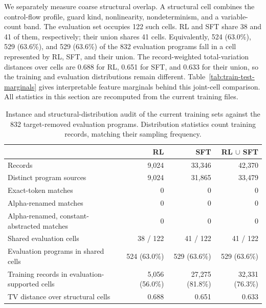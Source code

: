 We separately measure coarse structural overlap.  A structural cell combines
the control-flow profile, guard kind, nonlinearity, nondeterminism, and a
variable-count band.  The evaluation set occupies 122 such cells.  RL and SFT
share 38 and 41 of them, respectively; their union shares 41 cells.
Equivalently, 524 (63.0\%), 529 (63.6\%), and 529 (63.6\%) of the 832
evaluation programs fall in a cell represented by RL, SFT, and their union.
The record-weighted total-variation distances over cells are 0.688 for RL,
0.651 for SFT, and 0.633 for their union, so the training and evaluation
distributions remain different.  Table~\ref{tab:train-test-marginals} gives
interpretable feature marginals behind this joint-cell comparison.
All statistics in this section are recomputed from the current training files.

\begin{table}[H]
\centering
\setlength{\tabcolsep}{5pt}
\begin{tabular}{lrrr}
\toprule
\rowcolor{algobg}
 & RL & SFT & RL \(\cup\) SFT \\
\midrule
Records & 9,024 & 33,346 & 42,370 \\
Distinct program sources & 9,024 & 31,865 & 33,479 \\
Exact-token matches & 0 & 0 & 0 \\
Alpha-renamed matches & 0 & 0 & 0 \\
Alpha-renamed, constant-abstracted matches & 0 & 0 & 0 \\
Shared evaluation cells & 38 / 122 & 41 / 122 & 41 / 122 \\
Evaluation programs in shared cells & 524 (63.0\%) & 529 (63.6\%) & 529 (63.6\%) \\
Training records in evaluation-supported cells & 5,056 (56.0\%) & 27,275 (81.8\%) & 32,331 (76.3\%) \\
TV distance over structural cells & 0.688 & 0.651 & 0.633 \\
\bottomrule
\end{tabular}
\caption{Instance and structural-distribution audit of the current training
sets against the 832 target-removed evaluation programs.  Distribution
statistics count training records, matching their sampling frequency.}
\label{tab:train-test-leakage}
\end{table}

